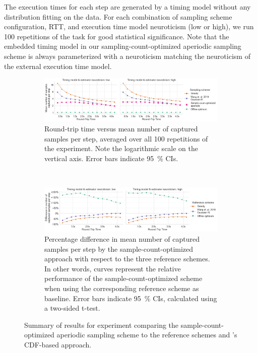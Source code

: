 The execution times for each step are generated by a timing model without any distribution fitting on the data.
For each combination of sampling scheme configuration, \gls{RTT}, and execution time model neuroticism (low or high), we run \num{100} repetitions of the task for good statistical significance.
Note that the embedded timing model in our sampling-count-optimized aperiodic sampling scheme is always parameterized with a neuroticism matching the neuroticism of the external execution time model.

\begin{figure}
    \centering
    \begin{subfigure}[t]{\textwidth}
        \centering
        \includegraphics[width=\textwidth]{figs/new_model/sampling_optimization.png}
        \caption{%
            Round-trip time versus mean number of captured samples per step, averaged over all \num{100} repetitions of the experiment.
            Note the logarithmic scale on the vertical axis.
            Error bars indicate \SI{95}{\percent} \glspl{CI}.
        }
    \end{subfigure}\\
    \medskip
    \begin{subfigure}[t]{\textwidth}
        \centering
        \includegraphics[width=\textwidth]{figs/new_model/sampling_optimization_diff.png}
        \caption{%
            Percentage difference in mean number of captured samples per step by the sample-count-optimized approach with respect to the three reference schemes.
            In other words, curves represent the relative performance of the sample-count-optimized scheme when using the corresponding reference scheme as baseline.
            Error bars indicate \SI{95}{\percent} \glspl{CI}, calculated using a two-sided t-test.
        }
    \end{subfigure}
    \caption{%
        Summary of results for experiment comparing the sample-count-optimized aperiodic sampling scheme to the reference schemes and \textcite{wang2019towards}'s \gls{CDF}-based approach.
    }\label{fig:optimization:samples}
\end{figure}

